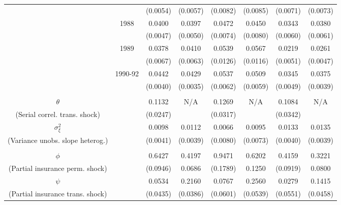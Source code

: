 \begin{table}
\begin{center}
{\begin{tabular}{cc|cc|cc|cc}
\\  &                    & (0.0054) & (0.0057)  & (0.0082) & (0.0085)  & (0.0071) & (0.0073) 
\\  & 1988 & 0.0400 &   0.0397 & 0.0472 &   0.0450 & 0.0343 &   0.0380
\\  &                    & (0.0047) & (0.0050)  & (0.0074) & (0.0080)  & (0.0060) & (0.0061) 
\\  & 1989 & 0.0378 &   0.0410 & 0.0539 &   0.0567 & 0.0219 &   0.0261
\\  &                    & (0.0067) & (0.0063)  & (0.0126) & (0.0116)  & (0.0051) & (0.0047) 
\\  & 1990-92 & 0.0442 &   0.0429 & 0.0537 &   0.0509 & 0.0345 &   0.0375 
\\  &         & (0.0040) & (0.0035) & (0.0062) & (0.0059) & (0.0049) & (0.0039) 
\\ \hline  
\\ $\theta$ &     & 0.1132 &   N/A & 0.1269 &   N/A & 0.1084 &   N/A 
\\ (Serial correl. trans. shock) &     & (0.0247) &  & (0.0317) &  & (0.0342) &  
\\ $\sigma^2_{\xi}$ &     & 0.0098 &   0.0112 & 0.0066 &   0.0095 & 0.0133 &   0.0135 
\\ (Variance unobs. slope heterog.) &     & (0.0041) & (0.0039) & (0.0080) & (0.0073) & (0.0040) & (0.0039) 
\\ \hline  
\\ $\phi$ &     & 0.6427 &   0.4197 & 0.9471 &   0.6202 & 0.4159 &   0.3221 
\\ (Partial insurance perm. shock) &     & (0.0946) & 0.0686 & (0.1789) & 0.1250 & (0.0919) & 0.0800 
\\ $\psi$ &     & 0.0534 &   0.2160 & 0.0767 &   0.2560 & 0.0279 &   0.1415 
\\ (Partial insurance trans. shock) &     & (0.0435) & (0.0386) & (0.0601) & (0.0539) & (0.0551) & (0.0458) 
\\ \hline  
 \end{tabular}   
 } 
 \usebox{\ReplicationTable}  
\settowidth\TableWidth{\usebox{\ReplicationTable}} %
\end{center}  
\end{table}  
